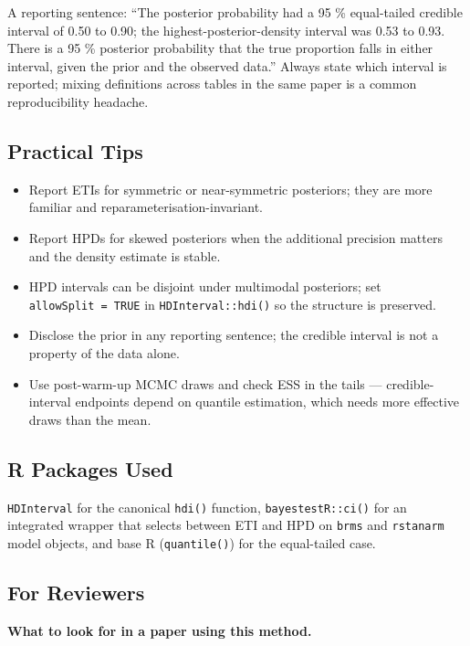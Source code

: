 \documentclass[
]{article}
\providecommand{\tightlist}{%
  \setlength{\itemsep}{0pt}\setlength{\parskip}{0pt}}
\begin{document}
A reporting sentence: ``The posterior probability had a 95 \%
equal-tailed credible interval of 0.50 to 0.90; the
highest-posterior-density interval was 0.53 to 0.93. There is a 95 \%
posterior probability that the true proportion falls in either interval,
given the prior and the observed data.'' Always state which interval is
reported; mixing definitions across tables in the same paper is a common
reproducibility headache.

\subsection{Practical Tips}\label{practical-tips}

\begin{itemize}
\tightlist
\item
  Report ETIs for symmetric or near-symmetric posteriors; they are more
  familiar and reparameterisation-invariant.
\item
  Report HPDs for skewed posteriors when the additional precision
  matters and the density estimate is stable.
\item
  HPD intervals can be disjoint under multimodal posteriors; set
  \texttt{allowSplit\ =\ TRUE} in \texttt{HDInterval::hdi()} so the
  structure is preserved.
\item
  Disclose the prior in any reporting sentence; the credible interval is
  not a property of the data alone.
\item
  Use post-warm-up MCMC draws and check ESS in the tails ---
  credible-interval endpoints depend on quantile estimation, which needs
  more effective draws than the mean.
\end{itemize}

\subsection{R Packages Used}\label{r-packages-used}

\texttt{HDInterval} for the canonical \texttt{hdi()} function,
\texttt{bayestestR::ci()} for an integrated wrapper that selects between
ETI and HPD on \texttt{brms} and \texttt{rstanarm} model objects, and
base R (\texttt{quantile()}) for the equal-tailed case.

\subsection{For Reviewers}\label{for-reviewers}

\textbf{What to look for in a paper using this method.}
\end{document}
